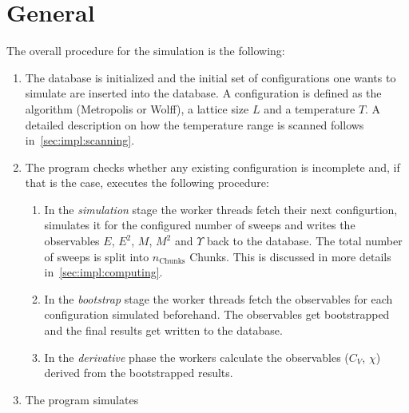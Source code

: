 	\section{General}\label{sec:impl:overall}
	The overall procedure for the simulation is the following:
	\begin{enumerate}
		\item The database is initialized and the initial set of configurations one wants to simulate are inserted into the database. A configuration is defined as the algorithm (Metropolis or Wolff), a lattice size $L$ and a temperature $T$. A detailed description on how the temperature range is scanned follows in~\cref{sec:impl:scanning}.
		\item The program checks whether any existing configuration is incomplete and, if that is the case, executes the following procedure:
			\begin{enumerate}
				\item In the \emph{simulation} stage the worker threads fetch their next configurtion, simulates it for the configured number of sweeps and writes the observables $E$, $E^2$, $M$, $M^2$ and $\Upsilon$ back to the database. The total number of sweeps is split into $n_\text{Chunks}$ Chunks. This is discussed in more details in~\cref{sec:impl:computing}.
				\item In the \emph{bootstrap} stage the worker threads fetch the observables for each configuration simulated beforehand. The observables get bootstrapped and the final results get written to the database.
				\item In the \emph{derivative} phase the workers calculate the observables ($C_V$, $\chi$) derived from the bootstrapped results.
			\end{enumerate}
		\item The program simulates 
	\end{enumerate}